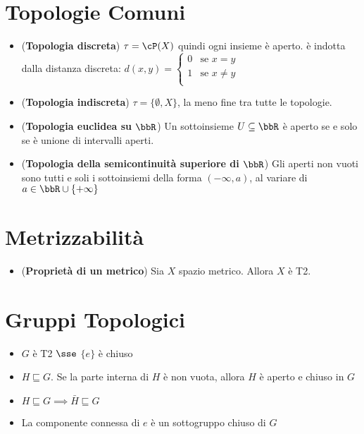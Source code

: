 \documentclass[a4paper,NoNotes,GeneralMath]{stdmdoc}
\newcommand{\sgr}{\sqsubseteq}
\begin{document}
	\section*{Topologie Comuni}
	\begin{itemize}
		\item ({\bf Topologia discreta}) $\tau = \cP (X)$ quindi ogni insieme è aperto. è indotta dalla distanza discreta: $d(x,y) = \left\{ \begin{array}{cr} 0 & \text{se } x = y \\ 1 & \text{se } x \neq y \\ \end{array} \right. $
		\item ({\bf Topologia indiscreta}) $\tau = \{\emptyset, X\}$, la meno fine tra tutte le topologie.
		\item ({\bf Topologia euclidea su $\bbR$}) Un sottoinsieme $U \subseteq \bbR$ è aperto se e solo se è unione di intervalli aperti.
		\item ({\bf Topologia della semicontinuità superiore di $\bbR$}) Gli aperti non vuoti sono tutti e soli i sottoinsiemi della forma $( - \infty , a)$, al variare di $a \in \bbR \cup \{+ \infty\}$
	\end{itemize}

	\section*{Metrizzabilità}
	\begin{itemize}
		\item ({\bf Proprietà di un metrico}) Sia $X$ spazio metrico. Allora $X$ è T2.
	\end{itemize}

	\section*{Gruppi Topologici}
	\begin{itemize}
		\item $G$ è T2 $\sse$ $\{ e \}$ è chiuso
		\item $H \sgr G$. Se la parte interna di $H$ è non vuota, allora $H$ è aperto e chiuso in $G$
		\item $H \sgr G \implies \bar{H} \sgr G$
		\item La componente connessa di $e$ è un sottogruppo chiuso di $G$
	\end{itemize}
\end{document}
